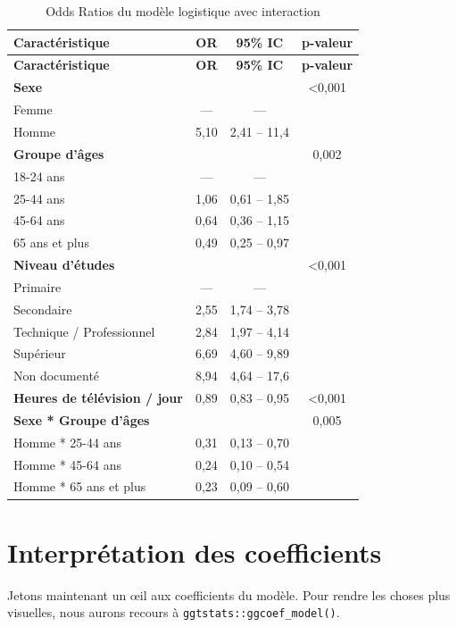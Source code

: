 \documentclass[
  letterpaper,
  DIV=11,
  numbers=noendperiod,
  oneside]{scrreprt}
\begin{document}
\hypertarget{tbl-or-modele-interaction}{}
\begin{longtable}[]{@{}lccc@{}}
\caption{\label{tbl-or-modele-interaction}Odds Ratios du modèle
logistique avec interaction}\tabularnewline
\toprule()
\textbf{Caractéristique} & \textbf{OR} & \textbf{95\% IC} &
\textbf{p-valeur} \\
\midrule()
\endfirsthead
\toprule()
\textbf{Caractéristique} & \textbf{OR} & \textbf{95\% IC} &
\textbf{p-valeur} \\
\midrule()
\endhead
\textbf{Sexe} & & & \textless0,001 \\
Femme & --- & --- & \\
Homme & 5,10 & 2,41 -- 11,4 & \\
\textbf{Groupe d'âges} & & & 0,002 \\
18-24 ans & --- & --- & \\
25-44 ans & 1,06 & 0,61 -- 1,85 & \\
45-64 ans & 0,64 & 0,36 -- 1,15 & \\
65 ans et plus & 0,49 & 0,25 -- 0,97 & \\
\textbf{Niveau d'études} & & & \textless0,001 \\
Primaire & --- & --- & \\
Secondaire & 2,55 & 1,74 -- 3,78 & \\
Technique / Professionnel & 2,84 & 1,97 -- 4,14 & \\
Supérieur & 6,69 & 4,60 -- 9,89 & \\
Non documenté & 8,94 & 4,64 -- 17,6 & \\
\textbf{Heures de télévision / jour} & 0,89 & 0,83 -- 0,95 &
\textless0,001 \\
\textbf{Sexe * Groupe d'âges} & & & 0,005 \\
Homme * 25-44 ans & 0,31 & 0,13 -- 0,70 & \\
Homme * 45-64 ans & 0,24 & 0,10 -- 0,54 & \\
Homme * 65 ans et plus & 0,23 & 0,09 -- 0,60 & \\
\bottomrule()
\end{longtable}

\hypertarget{interpruxe9tation-des-coefficients}{%
\section{Interprétation des
coefficients}\label{interpruxe9tation-des-coefficients}}

Jetons maintenant un œil aux coefficients du modèle. Pour rendre les
choses plus visuelles, nous aurons recours à
\texttt{ggtstats::ggcoef\_model()}.
\end{document}
